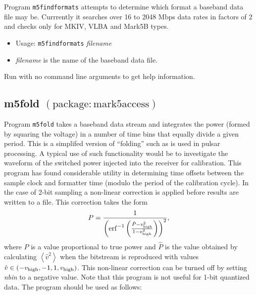 Program {\tt m5findformats} attempts to determine which format a baseband data file may be.
Currrently it searches over 16 to 2048 Mbps data rates in factors of 2 and checks only for MKIV, VLBA and Mark5B types.

\begin{itemize}
\item[] Usage: {\tt m5findformats} {\em filename}
\item {\em filename} is the name of the baseband data file.
\end{itemize}

Run with no command line arguments to get help information.







\subsection{m5fold {\small $\mathrm{(package: mark5access)}$}} \label{sec:m5fold}

Program {\tt m5fold} takes a baseband data stream and integrates the power (formed by squaring the voltage) in a number of time bins that equally divide a given period.
This is a simplifed version of ``folding'' such as is used in pulsar processing.
A typical use of such functionality would be to investigate the waveform of the switched power injected into the receiver for calibration.
This program has found considerable utility in determining time offsets between the sample clock and formatter time (modulo the period of the calibration cycle).
In the case of 2-bit sampling a non-linear correction is applied before results are written to a file.
This correction takes the form
\begin{equation}
P = \frac{1}{\left({\rm erf}^{-1}\left(\frac{\hat{P} - v_{\rm high}^2}{1 - v_{\rm high}^2} \right)\right)^2},
\end{equation}
where $P$ is a value proportional to true power and $\hat{P}$ is the value obtained by calculating $\left<\hat{v}^2\right>$ when the bitstream is reproduced with values $\hat{v} \in ( -v_{\rm high}, -1, 1, v_{\rm high} )$. 
This non-linear correction can be turned off by setting {\em nbin} to a negative value.
Note that this program is not useful for 1-bit quantized data.
The program should be used as follows:

